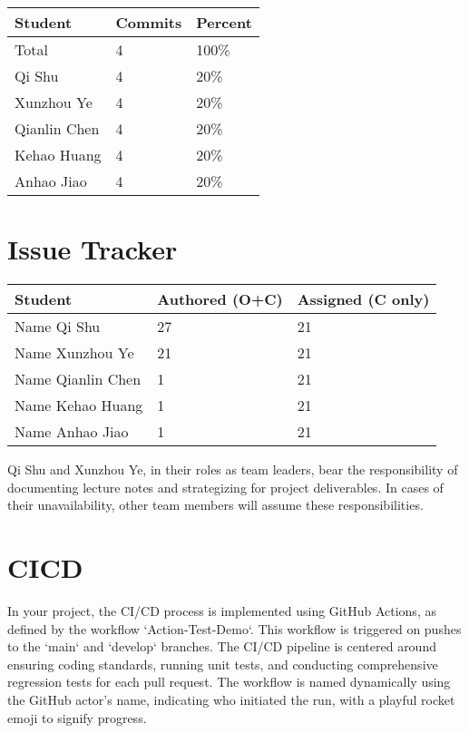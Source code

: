 \documentclass{article}
\begin{document}
\begin{table}[H]
\centering
\begin{tabular}{lll}
\toprule
\textbf{Student} & \textbf{Commits} & \textbf{Percent}\\
\midrule
Total & 4 & 100\% \\
Qi Shu & 4 & 20\% \\
Xunzhou Ye & 4 & 20\% \\
Qianlin Chen & 4 & 20\% \\
Kehao Huang & 4 & 20\% \\
Anhao Jiao & 4 & 20\% \\
\bottomrule
\end{tabular}
\end{table}



\section{Issue Tracker}


\begin{table}[H]
\centering
\begin{tabular}{lll}
\toprule
\textbf{Student} & \textbf{Authored (O+C)} & \textbf{Assigned (C only)}\\
\midrule
Name Qi Shu & 27 & 21 \\
Name Xunzhou Ye & 21 & 21 \\
Name Qianlin Chen & 1 & 21 \\
Name Kehao Huang & 1 & 21 \\
Name Anhao Jiao & 1 & 21 \\
\bottomrule
\end{tabular}
\end{table}


Qi Shu and Xunzhou Ye, in their roles as team leaders, bear the responsibility of 
documenting lecture notes and strategizing for project deliverables. In cases 
of their unavailability, other team members will assume these responsibilities.

\section{CICD}
In your project, the CI/CD process is implemented using GitHub Actions, as defined by the workflow `Action-Test-Demo`. 
This workflow is triggered on pushes to the `main` and `develop` branches. 
The CI/CD pipeline is centered around ensuring coding standards, running unit tests, and conducting comprehensive regression tests for each pull request. 
The workflow is named dynamically using the GitHub actor's name, indicating who initiated the run, with a playful rocket emoji to signify progress.
\end{document}
